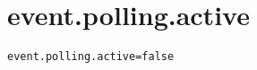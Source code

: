 \section{event.polling.active}
\label{configuration:EventPollingActive}
\ClearAPI
\TODO
{}
\begin{lstlisting}[style=Props,caption={Usage example for \textit{event.polling.active}}]
event.polling.active=false
\end{lstlisting}